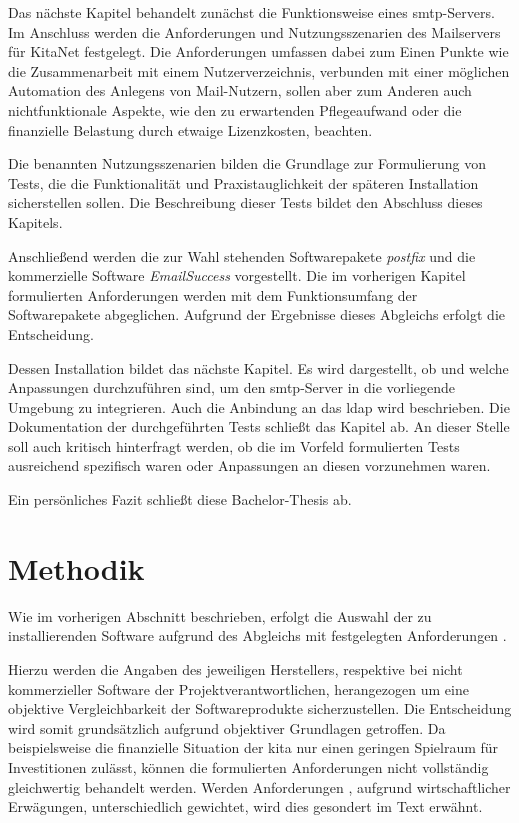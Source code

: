 Das nächste Kapitel behandelt zunächst die Funktionsweise eines \ac{smtp}-Servers. Im Anschluss werden die Anforderungen und Nutzungsszenarien des Mailservers für KitaNet festgelegt. Die Anforderungen umfassen dabei zum Einen Punkte wie die Zusammenarbeit mit einem Nutzerverzeichnis, verbunden mit einer möglichen Automation des Anlegens von Mail-Nutzern, sollen aber zum Anderen auch nichtfunktionale Aspekte, wie den zu erwartenden Pflegeaufwand oder die finanzielle Belastung durch etwaige Lizenzkosten, beachten.

Die benannten Nutzungsszenarien bilden die Grundlage zur Formulierung von Tests, die die Funktionalität und Praxistauglichkeit der späteren Installation sicherstellen sollen. Die Beschreibung dieser Tests bildet den Abschluss  dieses Kapitels.

Anschließend werden die zur Wahl stehenden Softwarepakete \textit{postfix} und die kommerzielle Software \textit{EmailSuccess} vorgestellt. Die im vorherigen Kapitel formulierten Anforderungen werden mit dem Funktionsumfang der Softwarepakete abgeglichen. Aufgrund der Ergebnisse dieses Abgleichs erfolgt die Entscheidung. 

Dessen Installation bildet das nächste Kapitel. Es wird dargestellt, ob und welche Anpassungen durchzuführen sind, um den \ac{smtp}-Server in die vorliegende Umgebung zu integrieren. Auch die Anbindung an das \ac{ldap} wird beschrieben.
Die Dokumentation der durchgeführten Tests schließt das Kapitel ab. An dieser Stelle soll auch kritisch hinterfragt werden, ob die im Vorfeld formulierten Tests ausreichend spezifisch waren oder Anpassungen an diesen vorzunehmen waren.

Ein persönliches Fazit schließt diese Bachelor-Thesis ab.

\section{Methodik}

Wie im vorherigen Abschnitt beschrieben, erfolgt die Auswahl der zu installierenden Software aufgrund des Abgleichs mit festgelegten Anforderungen .

Hierzu werden die Angaben des jeweiligen Herstellers, respektive bei nicht kommerzieller Software der Projektverantwortlichen, herangezogen um eine objektive Vergleichbarkeit der Softwareprodukte sicherzustellen. Die Entscheidung wird somit grundsätzlich aufgrund objektiver Grundlagen getroffen.  Da beispielsweise die finanzielle Situation der \ac{kita} nur einen geringen Spielraum für Investitionen zulässt, können die formulierten Anforderungen nicht vollständig gleichwertig behandelt werden. Werden Anforderungen , \zb aufgrund wirtschaftlicher Erwägungen, unterschiedlich gewichtet, wird dies gesondert im Text erwähnt.


